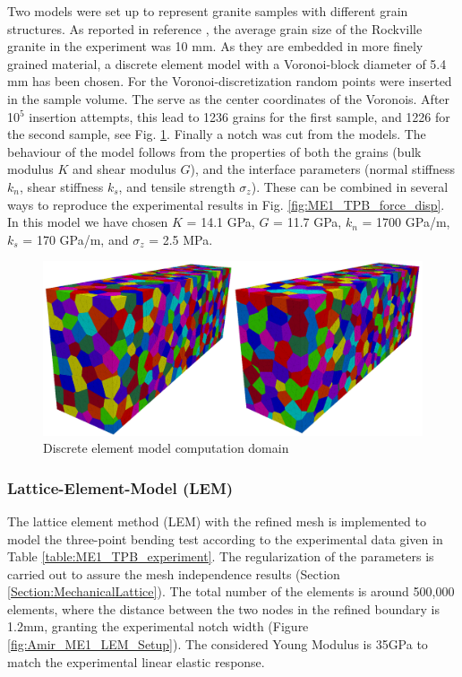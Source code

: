 Two models were set up to represent granite samples with different grain structures. As reported in reference \cite{Tarokh2016161}, the average grain size of the Rockville granite in the experiment was 10 mm. 
As they are embedded in more finely grained material, a discrete element model with a Voronoi-block diameter of 5.4 mm has been chosen. For the Voronoi-discretization random points were inserted in the sample volume. 
The serve as the center coordinates of the Voronois. After 10$^5$ insertion attempts, this lead to 1236 grains for the first sample, and 1226 for the second sample, see Fig. \ref{fig:ME1_TPB_DEM_domain}. Finally a notch was cut from the models. The behaviour of the model follows from the properties of both the grains (bulk modulus $K$ and shear modulus $G$), and the interface parameters (normal stiffness $k_n$, shear stiffness $k_s$, and tensile strength $\sigma_z$). These can be combined in several ways to reproduce the experimental results in Fig. \ref{fig:ME1_TPB_force_disp}. In this model we have chosen $K$ = 14.1 GPa, $G$ = 11.7 GPa, $k_n$ = 1700 GPa/m, $k_s$ = 170 GPa/m, and $\sigma_z$ = 2.5 MPa. 

\begin{figure}[!ht]
\centering
\includegraphics[width=1\textwidth]{figures/ME1-DEM-samples.png}
\caption{Discrete element model computation domain}
\label{fig:ME1_TPB_DEM_domain}
\end{figure}

\subsubsection*{Lattice-Element-Model (LEM)}

The lattice element method (LEM) with the refined mesh is implemented to model the three-point bending test according to the experimental data given in Table \ref{table:ME1_TPB_experiment}. The regularization of the parameters is carried out to assure the mesh independence results (Section \ref{Section:MechanicalLattice}). The total number of the elements is around 500,000 elements, where the distance between the two nodes in the refined boundary is 1.2mm, granting the experimental notch width (Figure \ref{fig:Amir_ME1_LEM_Setup}). The considered Young Modulus is 35GPa to match the experimental linear elastic response.

